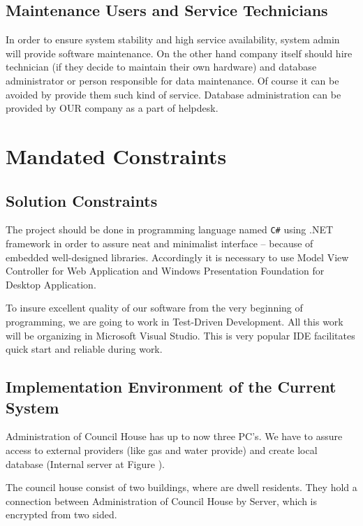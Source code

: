 \documentclass[a4paper,11pt,onecolumn,oneside]{book}
\begin{document}
\subsection{Maintenance Users and Service Technicians}

In order to ensure system stability and high service availability, system admin will provide software maintenance. On the other hand company itself should hire technician (if they decide to maintain their own hardware) and database administrator or person responsible for data maintenance. Of course it can be avoided by provide them such kind of service.
Database administration can be provided by OUR company as a part of helpdesk.



\section{Mandated Constraints}
\subsection{Solution Constraints}

The project should be done in programming language named \texttt{C\#} using .NET framework in order to assure neat and minimalist interface – because of embedded well-designed libraries. Accordingly it is necessary to use Model View Controller for Web Application and Windows Presentation Foundation for Desktop Application.

To insure excellent quality of our software from the very beginning of programming, we are going to work in Test-Driven Development. All this work will be organizing in Microsoft Visual Studio. This is very popular IDE facilitates quick start and reliable during work.

\subsection{Implementation Environment of the Current System}

Administration of Council House has up to now three PC’s. We have to assure access to external providers (like gas and water provide) and create local database (Internal server at Figure \label{fig:rys1}).

The council house consist of two buildings, where are dwell residents. They hold a connection between Administration of Council House by Server, which is encrypted from two sided.
\end{document}
